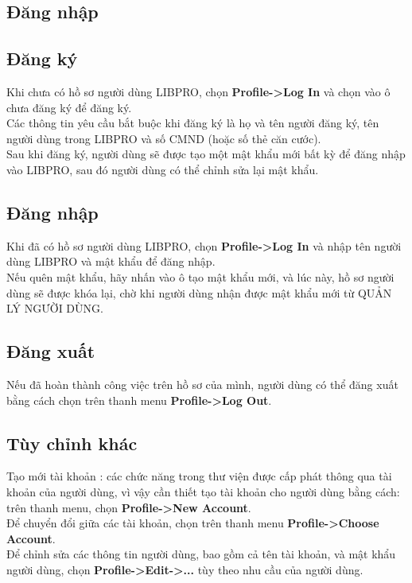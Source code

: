 \documentclass[12pt,a4paper]{report}
\begin{document}
        \subsection{Đăng nhập}
            \subsection{Đăng ký}
            Khi chưa có hồ sơ người dùng LIBPRO, chọn \textbf{Profile->Log In} và chọn vào ô chưa đăng ký để đăng ký.\\
            Các thông tin yêu cầu bắt buộc khi đăng ký là họ và tên người đăng ký, tên người dùng trong LIBPRO và số CMND (hoặc số thẻ căn cước).\\
            Sau khi đăng ký, người dùng sẽ được tạo một mật khẩu mới bất kỳ để đăng nhập vào LIBPRO, sau đó người dùng có thể chỉnh sửa lại mật khẩu.\\
            \subsection{Đăng nhập}
            Khi đã có hồ sơ người dùng LIBPRO, chọn \textbf{Profile->Log In} và nhập tên người dùng LIBPRO và mật khẩu để đăng nhập.\\
            Nếu quên mật khẩu, hãy nhấn vào ô tạo mật khẩu mới, và lúc này, hồ sơ người dùng sẽ được khóa lại, chờ khi người dùng nhận được mật khẩu mới từ QUẢN LÝ NGƯỜI DÙNG.\\
            \subsection{Đăng xuất}
            Nếu đã hoàn thành công việc trên hồ sơ của mình, người dùng có thể đăng xuất bằng cách chọn trên thanh menu \textbf{Profile->Log Out}.\\
            \subsection{Tùy chỉnh khác}
            Tạo mới tài khoản : các chức năng trong thư viện được cấp phát thông qua tài khoản của người dùng, vì vậy cần thiết tạo tài khoản cho người dùng bằng cách: trên thanh menu, chọn \textbf{Profile->New Account}.\\
            Để chuyển đổi giữa các tài khoản, chọn trên thanh menu \textbf{Profile->Choose Account}.\\
            Để chỉnh sửa các thông tin người dùng, bao gồm cả tên tài khoản, và mật khẩu người dùng, chọn \textbf{Profile->Edit->...} tùy theo nhu cầu của người dùng.\\
\end{document}
